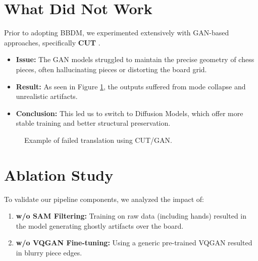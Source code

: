 \documentclass[12pt,a4paper]{article}
\begin{document}
\section{What Did Not Work}
\label{sec:not_work}

Prior to adopting BBDM, we experimented extensively with GAN-based approaches, specifically \textbf{CUT} \cite{cut2020}.

\begin{itemize}
    \item \textbf{Issue:} The GAN models struggled to maintain the precise geometry of chess pieces, often hallucinating pieces or distorting the board grid.
    \item \textbf{Result:} As seen in Figure \ref{fig:gan_fail}, the outputs suffered from mode collapse and unrealistic artifacts.
    \item \textbf{Conclusion:} This led us to switch to Diffusion Models, which offer more stable training and better structural preservation.
\end{itemize}

\begin{figure}[ht]
    \centering
    \caption{Example of failed translation using CUT/GAN.}
    \label{fig:gan_fail}
\end{figure}

\section{Ablation Study}
\label{sec:ablation}

To validate our pipeline components, we analyzed the impact of:
\begin{enumerate}
    \item \textbf{w/o SAM Filtering:} Training on raw data (including hands) resulted in the model generating ghostly artifacts over the board.
    \item \textbf{w/o VQGAN Fine-tuning:} Using a generic pre-trained VQGAN resulted in blurry piece edges.
\end{enumerate}
\end{document}
